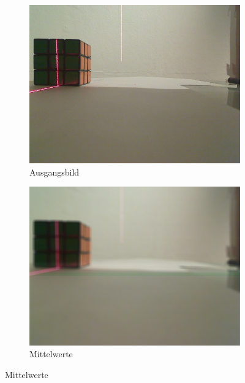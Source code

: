 \documentclass[ngerman,a4paper,parskip=half]{scrartcl}
\begin{document}
\begin{figure}[H]
	\centering

	\begin{subfigure}{0.45\textwidth}
		\includegraphics[width=\textwidth]{includes/line_line.png}
		\caption{Ausgangsbild}
	\end{subfigure}
	\hfill
	\begin{subfigure}{0.45\textwidth}
		\includegraphics[width=\textwidth]{includes/line_peak_avg.png}
		\caption{Mittelwerte}
	\end{subfigure}


\end{figure}
\end{document}
